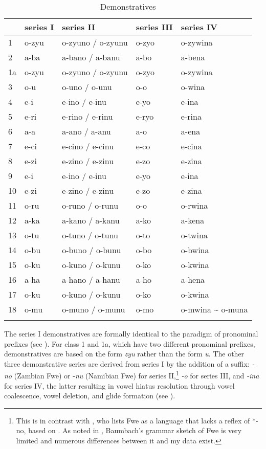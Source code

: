 \begin{table}
\label{bkm:Ref491095359}\caption{\label{tab:4:19}Demonstratives}
\begin{tabular}{lllll}
\lsptoprule
& series I & series II & series III & series IV\\
\midrule
1 & o-zyu & o-zyuno / o-zyunu & o-zyo & o-zywina\\
2 & a-ba & a-bano / a-banu & a-bo & a-bena\\
1a & o-zyu & o-zyuno / o-zyunu & o-zyo & o-zywina\\
3 & o-u & o-uno / o-unu & o-o & o-wina\\
4 & e-i & e-ino / e-inu & e-yo & e-ina\\
5 & e-ri & e-rino / e-rinu & e-ryo & e-rina\\
6 & a-a & a-ano / a-anu & a-o & a-ena\\
7 & e-ci & e-cino / e-cinu & e-co & e-cina\\
8 & e-zi & e-zino / e-zinu & e-zo & e-zina\\
9 & e-i & e-ino / e-inu & e-yo & e-ina\\
10 & e-zi & e-zino / e-zinu & e-zo & e-zina\\
11 & o-ru & o-runo / o-runu & o-o & o-rwina\\
12 & a-ka & a-kano / a-kanu & a-ko & a-kena\\
13 & o-tu & o-tuno / o-tunu & o-to & o-twina\\
14 & o-bu & o-buno / o-bunu & o-bo & o-bwina\\
15 & o-ku & o-kuno / o-kunu & o-ko & o-kwina\\
16 & a-ha & a-hano / a-hanu & a-ho & a-hena\\
17 & o-ku & o-kuno / o-kunu & o-ko & o-kwina\\
18 & o-mu & o-muno / o-munu & o-mo & o-mwina {\textasciitilde} o-muna\\
\lspbottomrule
\end{tabular}
\end{table}

The series I demonstratives are formally identical to the paradigm of pronominal prefixes (see ). For class 1 and 1a, which have two different pronominal prefixes, demonstratives are based on the form \textit{zyu} rather than the form \textit{u}. The other three demonstrative series are derived from series I by the addition of a suffix: \textit{-no} (Zambian Fwe) or \nobreakdash-\textit{nu} (Namibian Fwe) for series II,\footnote{This is in contrast with {\citet{Nicolle2012}}, who lists Fwe as a language that lacks a reflex of *\nobreakdash-no, based on \citet{Baumbach1997}. As noted in , Baumbach’s grammar sketch of Fwe is very limited and numerous differences between it and my data exist.} \textit{-o} for series III, and \textit{-ina} for series IV, the latter resulting in vowel hiatus resolution through vowel coalescence, vowel deletion, and glide formation (see ).

